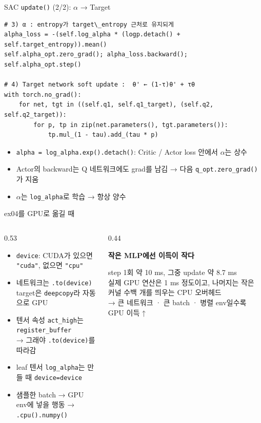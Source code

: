 \documentclass[aspectratio=169,11pt,xcolor=table]{beamer}
\newcommand{\warntitle}[1]{{\bfseries\color{accent}#1}\par\smallskip}
\newcommand{\cc}[1]{\texttt{#1}}
\begin{document}
\begin{frame}[fragile]{SAC \cc{update()} (2/2): $\alpha$ → Target}
\begin{lstlisting}
# 3) α : entropy가 target\_entropy 근처로 유지되게
alpha_loss = -(self.log_alpha * (logp.detach() + self.target_entropy)).mean()
self.alpha_opt.zero_grad(); alpha_loss.backward(); self.alpha_opt.step()

# 4) Target network soft update :  θ' ← (1-τ)θ' + τθ
with torch.no_grad():
    for net, tgt in ((self.q1, self.q1_target), (self.q2, self.q2_target)):
        for p, tp in zip(net.parameters(), tgt.parameters()):
            tp.mul_(1 - tau).add_(tau * p)
\end{lstlisting}
  \vspace{0.3em}
  \begin{itemize}\small
    \item \cc{alpha = log\_alpha.exp().detach()}: Critic / Actor loss 안에서 $\alpha$는 상수
    \item Actor의 backward는 Q 네트워크에도 grad를 남김 → 다음 \cc{q\_opt.zero\_grad()}가 지움
    \item $\alpha$는 \cc{log\_alpha}로 학습 → 항상 양수
  \end{itemize}
\end{frame}

\begin{frame}[fragile]{ex04를 GPU로 옮길 때}
  \begin{columns}[T,onlytextwidth]
    \begin{column}{0.53\textwidth}
      \begin{itemize}\small
        \item \cc{device}: CUDA가 있으면 \cc{"cuda"}, 없으면 \cc{"cpu"}
        \item 네트워크는 \cc{.to(device)}\\
              target은 \cc{deepcopy}라 자동으로 GPU
        \item 텐서 속성 \cc{act\_high}는 \cc{register\_buffer}\\
              → 그래야 \cc{.to(device)}를 따라감
        \item leaf 텐서 \cc{log\_alpha}는 만들 때 \cc{device=device}
        \item 샘플한 batch → GPU\\
              env에 넣을 행동 → \cc{.cpu().numpy()}
      \end{itemize}
    \end{column}
    \begin{column}{0.44\textwidth}
      \begin{warnbox}
        \warntitle{작은 MLP에선 이득이 작다}
        \small
        step 1회 약 10 ms, 그중 update 약 8.7 ms\\[3pt]
        실제 GPU 연산은 1 ms 정도이고, 나머지는 작은 커널 수백 개를 띄우는 CPU 오버헤드\\[3pt]
        → 큰 네트워크 · 큰 batch · 병렬 env일수록 GPU 이득 ↑
      \end{warnbox}
    \end{column}
  \end{columns}
\end{frame}
\end{document}
